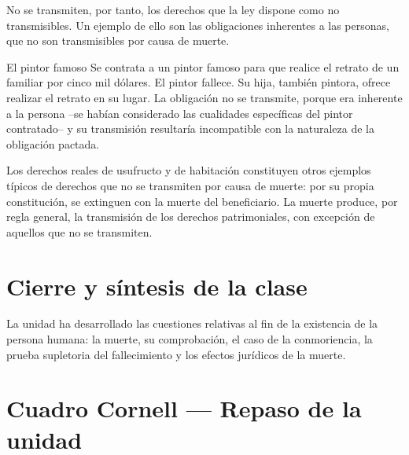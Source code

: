 \documentclass[12pt,oneside]{book}
\begin{document}
No se transmiten, por tanto, los derechos que la ley dispone como no transmisibles. Un ejemplo de ello son las obligaciones inherentes a las personas, que no son transmisibles por causa de muerte.

\begin{example}{El pintor famoso}
Se contrata a un pintor famoso para que realice el retrato de un familiar por cinco mil dólares. El pintor fallece. Su hija, también pintora, ofrece realizar el retrato en su lugar. La obligación no se transmite, porque era inherente a la persona --se habían considerado las cualidades específicas del pintor contratado-- y su transmisión resultaría incompatible con la naturaleza de la obligación pactada.
\end{example}

Los derechos reales de usufructo y de habitación constituyen otros ejemplos típicos de derechos que no se transmiten por causa de muerte: por su propia constitución, se extinguen con la muerte del beneficiario. La muerte produce, por regla general, la transmisión de los derechos patrimoniales, con excepción de aquellos que no se transmiten.

\section*{Cierre y síntesis de la clase}

La unidad ha desarrollado las cuestiones relativas al fin de la existencia de la persona humana: la muerte, su comprobación, el caso de la conmoriencia, la prueba supletoria del fallecimiento y los efectos jurídicos de la muerte.

\section*{Cuadro Cornell --- Repaso de la unidad}
\end{document}
